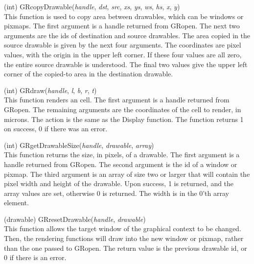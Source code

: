 \begin{description}
\item{(int) \vt GRcopyDrawable({\it handle}, {\it dst}, {\it src},
  {\it xs}, {\it ys}, {\it ws}, {\it hs}, {\it x}, {\it y\/})}\\
This function is used to copy area between drawables, which can be
windows or pixmaps.  The first argument is a handle returned from {\vt
GRopen}.  The next two arguments are the ids of destination and source
drawables.  The area copied in the source drawable is given by the
next four arguments.  The coordinates are pixel values, with the
origin in the upper left corner.  If these four values are all zero,
the entire source drawable is understood.  The final two values give
the upper left corner of the copied-to area in the destination
drawable.

\item{(int) \vt GRdraw({\it handle}, {\it l}, {\it b}, {\it r},
  {\it t\/})}\\
This function renders an {\Xic} cell.  The first argument is a handle
returned from {\vt GRopen}.  The remaining arguments are the
coordinates of the cell to render, in microns.  The action is the same
as the {\vt Display} function.  The function returns 1 on success, 0
if there was an error.

\item{(int) \vt GRgetDrawableSize({\it handle}, {\it drawable},
  {\it array\/})}\\
This function returns the size, in pixels, of a drawable.  The first
argument is a handle returned from {\vt GRopen}.  The second argument
is the id of a window or pixmap.  The third argument is an array of
size two or larger that will contain the pixel width and height of the
drawable.  Upon success, 1 is returned, and the array values are set,
otherwise 0 is returned.  The width is in the 0'th array element.

\item{(drawable) \vt GRresetDrawable({\it handle}, {\it drawable\/})}\\
This function allows the target window of the graphical context to be
changed.  Then, the rendering functions will draw into the new window
or pixmap, rather than the one passed to {\vt GRopen}.  The return
value is the previous drawable id, or 0 if there is an error.


\end{description}
